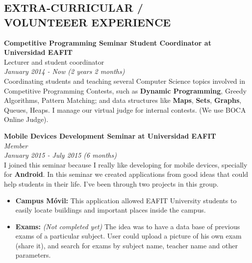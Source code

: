 \documentclass[margin, 10pt]{res} %
\begin{document}
\begin{resume}

\section{EXTRA-CURRICULAR / \\ VOLUNTEEER EXPERIENCE}
\textbf{Competitive Programming Seminar Student Coordinator at Universidad EAFIT} \\
Lecturer and student coordinator \\
\textit{January 2014 - Now (2 years 2 months)} \\
Coordinating students and teaching several Computer Science topics involved in Competitive
Programming Contests, such as \textbf{Dynamic Programming}, Greedy Algorithms, Pattern Matching;
and data structures like \textbf{Maps}, \textbf{Sets}, \textbf{Graphs}, Queues, Heaps. I manage our
virtual judge for internal contests. (We use BOCA Online Judge).

\textbf{Mobile Devices Development Seminar at Universidad EAFIT} \\
\textit{Member} \\
\textit{January 2015 - July 2015 (6 months)} \\
I joined this seminar because I really like developing for mobile devices, specially for
\textbf{Android}. In this seminar we created applications from good ideas that could help
students in their life. I've been through two projects in this group.
\begin{itemize}
  \item \textbf{Campus Móvil:} This application allowed EAFIT University students to easily locate
                               buildings and important places inside the campus.
  \item \textbf{Exams:} \emph{(Not completed yet)} The idea was to have a data base of previous
                        exams of a particular subject. User could upload a picture of his own exam
                        (share it), and search for exams by subject name, teacher name and other
                        parameters.
\end{itemize}




\end{resume}
\end{document}
